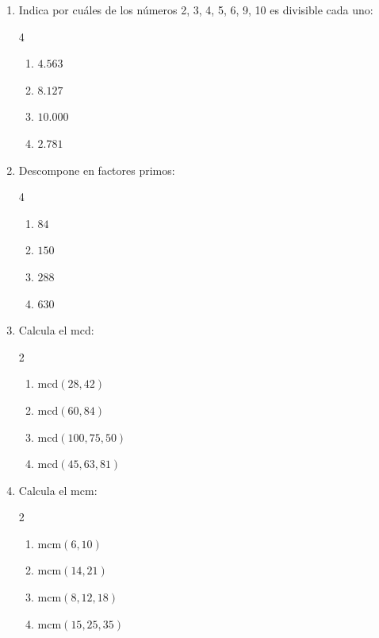 \documentclass[11pt, letterpaper]{article}
\begin{document}
\begin{enumerate}[label=\textbf{\arabic*.}, leftmargin=*]
  \item Indica por cu\'ales de los n\'umeros 2, 3, 4, 5, 6, 9, 10 es divisible cada uno:
  \begin{multicols}{4}
  \begin{enumerate}[label=\alph*)]
    \item $4.563$
    \item $8.127$
    \item $10.000$
    \item $2.781$
  \end{enumerate}
  \end{multicols}

  \item Descompone en factores primos:
  \begin{multicols}{4}
  \begin{enumerate}[label=\alph*)]
    \item $84$
    \item $150$
    \item $288$
    \item $630$
  \end{enumerate}
  \end{multicols}

  \item Calcula el mcd:
  \begin{multicols}{2}
  \begin{enumerate}[label=\alph*)]
    \item $\text{mcd}(28,42)$
    \item $\text{mcd}(60,84)$
    \item $\text{mcd}(100,75,50)$
    \item $\text{mcd}(45,63,81)$
  \end{enumerate}
  \end{multicols}

  \item Calcula el mcm:
  \begin{multicols}{2}
  \begin{enumerate}[label=\alph*)]
    \item $\text{mcm}(6,10)$
    \item $\text{mcm}(14,21)$
    \item $\text{mcm}(8,12,18)$
    \item $\text{mcm}(15,25,35)$
  \end{enumerate}
  \end{multicols}
\end{enumerate}
\end{document}
